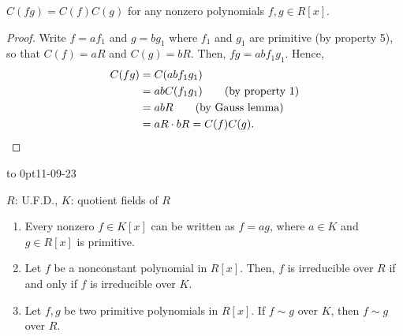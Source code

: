 \documentclass[twoside]{article}
\theoremstyle{remark}
\newcommand*\newclass[1]{\par\vbox to 0pt{\hbox{\tiny\sffamily\color{gray}#1}} \par\ignorespaces}
\begin{document}
\begin{corollary}
  \(C(fg) = C(f) C(g)\) for any nonzero polynomials \(f, g \in R[x]\).
\end{corollary}

\begin{proof}
  Write \(f = af_1\) and \(g = bg_1\) where \(f_1\) and \(g_1\) are primitive (by property 5), so that \(C(f) = aR\) and \(C(g) = bR\). Then, \(fg = abf_1g_1\). Hence,
  \begin{align*}
    C(fg) & = C(abf_1g_1) \\
    & = abC(f_1g_1) \tag{by property 1} \\
    & = abR \tag{by Gauss lemma} \\
    & = aR \cdot bR = C(f) C(g). \qedhere
  \end{align*}
\end{proof}

\newclass{11-09-23}

\begin{lemma}
  \(R\): U.F.D., \(K\): quotient fields of \(R\)
  \begin{enumerate}[label=\textup{(\arabic*)}, nosep]
    \item Every nonzero \(f \in K[x]\) can be written as \(f = ag\), where \(a \in K\) and \(g \in R[x]\) is primitive.
    \item Let \(f\) be a nonconstant polynomial in \(R[x]\). Then, \(f\) is irreducible over \(R\) if and only if \(f\) is irreducible over \(K\).
    \item Let \(f,g\) be two primitive polynomials in \(R[x]\). If \(f \sim g\) over \(K\), then \(f \sim g\) over \(R\).
  \end{enumerate}
\end{lemma}
\end{document}
